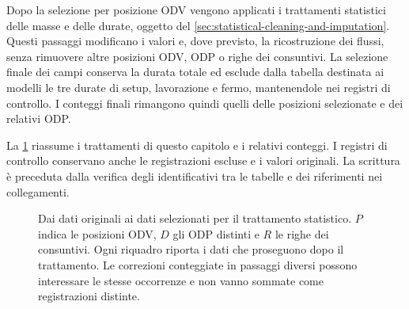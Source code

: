 Dopo la selezione per posizione ODV vengono applicati i trattamenti statistici delle masse e delle durate, oggetto del \cref{sec:statistical-cleaning-and-imputation}. Questi passaggi modificano i valori e, dove previsto, la ricostruzione dei flussi, senza rimuovere altre posizioni ODV, ODP o righe dei consuntivi. La selezione finale dei campi conserva la durata totale ed esclude dalla tabella destinata ai modelli le tre durate di setup, lavorazione e fermo, mantenendole nei registri di controllo. I conteggi finali rimangono quindi quelli delle posizioni selezionate e dei relativi ODP.

La \cref{fig:data-treatment-pipeline} riassume i trattamenti di questo capitolo e i relativi conteggi. I registri di controllo conservano anche le registrazioni escluse e i valori originali. La scrittura è preceduta dalla verifica degli identificativi tra le tabelle e dei riferimenti nei collegamenti.

\begin{figure}[p]
\centering

\caption{Dai dati originali ai dati selezionati per il trattamento statistico. $P$ indica le posizioni ODV, $D$ gli ODP distinti e $R$ le righe dei consuntivi. Ogni riquadro riporta i dati che proseguono dopo il trattamento. Le correzioni conteggiate in passaggi diversi possono interessare le stesse occorrenze e non vanno sommate come registrazioni distinte.}
\label{fig:data-treatment-pipeline}
\end{figure}
